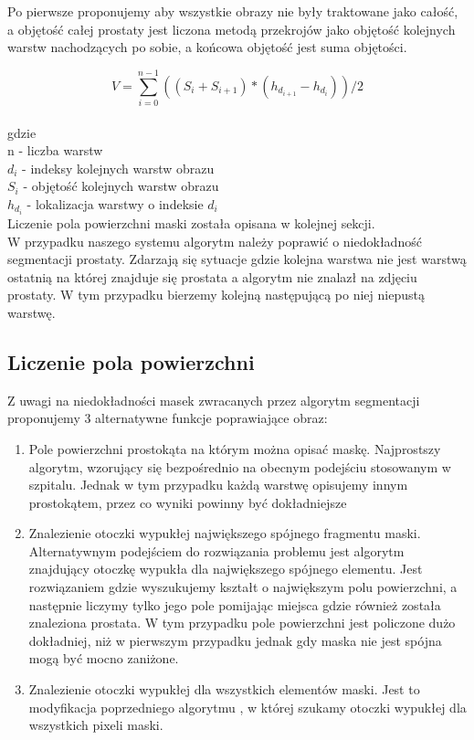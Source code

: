 \documentclass[a4paper,11pt,twoside]{report}
\theoremstyle{definition}
\begin{document}
Po pierwsze proponujemy aby wszystkie obrazy nie były traktowane jako całość, a objętość całej prostaty jest liczona metodą przekrojów jako objętość kolejnych warstw nachodzących po sobie, a końcowa objętość jest suma objętości. 

\[V = \sum_{i=0}^{n-1} ((S_i + S_{i+1}) * (h_{d_{i+1}} - h_{d_i})) / 2 \]
\\
gdzie\\
n - liczba warstw \\
\(d_i\) - indeksy kolejnych warstw obrazu \\
\(S_i\) - objętość kolejnych warstw obrazu \\
\(h_{d_i}\) - lokalizacja warstwy o indeksie \(d_{i}\) \\

Liczenie pola powierzchni maski została opisana w kolejnej sekcji. \\
W przypadku naszego systemu algorytm należy poprawić o niedokładność segmentacji prostaty. Zdarzają się sytuacje gdzie kolejna warstwa nie jest warstwą ostatnią na której znajduje się prostata a algorytm nie znalazł na zdjęciu prostaty. W tym przypadku bierzemy kolejną następującą po niej niepustą warstwę.

\subsection{Liczenie pola powierzchni}
Z uwagi na niedokładności masek zwracanych przez algorytm segmentacji proponujemy 3 alternatywne funkcje poprawiające obraz:
\begin{enumerate}
\item Pole powierzchni prostokąta na którym można opisać maskę. Najprostszy algorytm, wzorujący się bezpośrednio na obecnym podejściu stosowanym w szpitalu. Jednak w tym przypadku każdą warstwę opisujemy innym prostokątem, przez co wyniki powinny być dokładniejsze
\item Znalezienie otoczki wypukłej największego spójnego fragmentu maski. Alternatywnym podejściem do rozwiązania problemu jest algorytm znajdujący otoczkę wypukła dla największego spójnego elementu. Jest rozwiązaniem gdzie wyszukujemy kształt o największym polu powierzchni, a następnie liczymy tylko jego pole pomijając miejsca gdzie również została znaleziona prostata. W tym przypadku pole powierzchni jest policzone dużo dokładniej, niż w pierwszym przypadku jednak gdy maska nie jest spójna mogą być mocno zaniżone. 
\item Znalezienie otoczki wypukłej dla wszystkich elementów maski. Jest to modyfikacja poprzedniego algorytmu , w której szukamy otoczki wypukłej dla wszystkich pixeli maski.
\end{enumerate}
\end{document}
